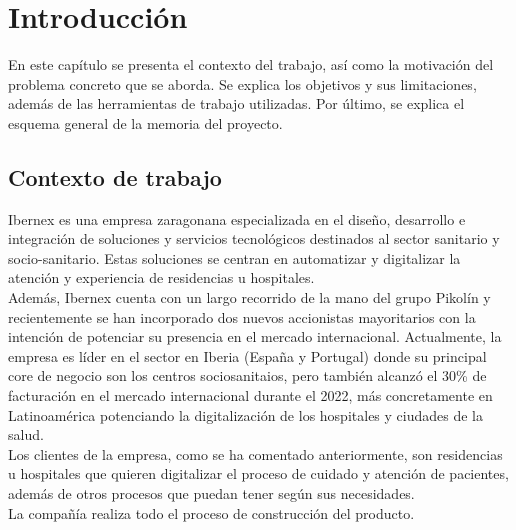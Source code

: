 \chapter{Introducción}
\label{ch:no_lineal}

En este capítulo se presenta el contexto del trabajo, así como la motivación del problema concreto que se aborda. Se explica los objetivos y sus limitaciones, además de las herramientas de trabajo utilizadas. Por último, se explica el esquema general de la memoria del proyecto.

\section{Contexto de trabajo}


 Ibernex \cite{ibernex} es una empresa zaragonana especializada en el diseño, desarrollo e integración de soluciones y servicios tecnológicos destinados al sector sanitario y socio-sanitario. Estas soluciones se centran en automatizar y digitalizar la atención y experiencia de residencias u hospitales.\\

 Además, Ibernex cuenta con un largo recorrido de la mano del grupo Pikolín y recientemente se han incorporado dos nuevos accionistas mayoritarios con la intención de potenciar su presencia en el mercado internacional. Actualmente, la empresa es líder en el sector en Iberia (España y Portugal) donde su principal core de negocio son los centros sociosanitaios, pero también alcanzó el 30\% de facturación en el mercado internacional durante el 2022, más concretamente en Latinoamérica potenciando la digitalización de los hospitales y ciudades de la salud. \\

 Los clientes de la empresa, como se ha comentado anteriormente, son residencias u hospitales que quieren digitalizar el proceso de cuidado y atención de pacientes, además de otros procesos que puedan tener según sus necesidades. \\



La compañía realiza todo el proceso de construcción del producto. \\

